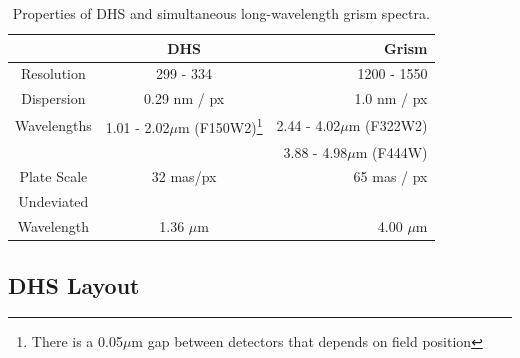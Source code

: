 \documentclass[iop]{emulateapj}
\newcommand{\DHSres}{299 - 334}
\begin{document}
\begin{table}
\centering
\begin{tabular}{ccr}
		& DHS	& Grism \\
 \hline \hline		
Resolution &  \DHSres & 1200 - 1550 \\
Dispersion & 0.29 nm / px & 1.0 nm / px \\
Wavelengths & 1.01 - 2.02$\mu$m (F150W2)\footnote{There is a 0.05$\mu$m gap between detectors that depends on field position} & 2.44 - 4.02$\mu$m (F322W2)\\
				& 								& 3.88 - 4.98$\mu$m (F444W) \\
Plate Scale & 32 mas/px  &  65 mas / px\\
Undeviated \\Wavelength & 1.36 $\mu$m & 4.00 $\mu$m   \\
\hline
\end{tabular}
\caption{Properties of DHS and simultaneous long-wavelength grism spectra.}\label{tab:DHSgprop}
\vspace{0.1in}
\end{table}

\subsection{DHS Layout}
\end{document}
